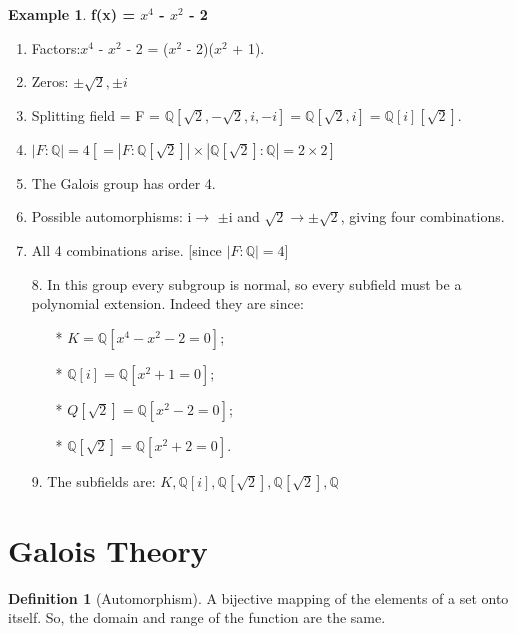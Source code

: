 \documentclass[12pt]{article}
\theoremstyle{definition}
\newtheorem{defn}[thm]{Definition}
\newtheorem{exmp}[thm]{Example}
\theoremstyle{remark}
\begin{document}
\begin{exmp}
\quad \textbf{f(x) = $x^{4}$ - $x^{2}$ - 2}
     \begin{enumerate}
    \item Factors:\quad $x^{4}$ - $x^{2}$ - 2 = ($x^{2}$ - 2)($x^{2}$ + 1).\\
     \item Zeros: $\pm \sqrt2, \pm i$\\
     \item Splitting field = F = $\mathbb{Q}[\sqrt 2, -\sqrt 2, i, -i] = \mathbb{Q}[\sqrt2, i] = \mathbb{Q}[i][\sqrt2].$\\
     \item $|F:\mathbb{Q}| = 4 [= |F:\mathbb{Q}[\sqrt2]|\times |\mathbb{Q}[\sqrt2]:\mathbb{Q}| = 2 \times2]$
     \item The Galois group has order 4.\\
     \item Possible automorphisms: i$\rightarrow$ $\pm$i and $\sqrt2\rightarrow \pm \sqrt 2$, giving four combinations.\\
    \item All 4 combinations arise. [since $|F : \mathbb{Q}| = 4]$
      \end{enumerate}
\end{exmp}

\begin{itemize}
  \item [8.]In this group every subgroup is normal, so every subfield must be a polynomial extension. Indeed they are since:
  \begin{itemize}
     \item[*] $K = \mathbb{Q}[x^{4} - x^{2} - 2 =0]$;
     \item[*] $\mathbb{Q}[i] = \mathbb{Q}[x^{2} + 1 = 0]$;
     \item[*] $Q[\sqrt2] = \mathbb{Q}[x^{2} - 2 = 0]$;
     \item[*] $\mathbb{Q}[\sqrt2] = \mathbb{Q}[x^{2} + 2 = 0]$.
  \end{itemize}
  \item [9.] The subfields are: $K,\mathbb{Q}[i], \mathbb{Q}[\sqrt2],\mathbb{Q}[\sqrt2],\mathbb{Q}$
\end{itemize}

\section{Galois Theory}

\begin{defn}[Automorphism]
 A bijective mapping of the elements of a set onto itself. So, the domain and range of the function are the same.
\end{defn}
\end{document}
